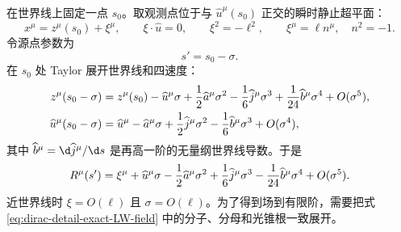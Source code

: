 在世界线上固定一点 $s_0$。取观测点位于与 $\widehat u^\mu(s_0)$ 正交的瞬时静止超平面：
\begin{equation}
 x^\mu=z^\mu(s_0)+\xi^\mu,
 \qquad
 \xi\cdot \widehat u=0,
 \qquad
 \xi^2=-\ell^2,
 \qquad
 \xi^\mu=\ell n^\mu,
 \quad n^2=-1.
 \label{eq:dirac-detail-near-point}
\end{equation}
令源点参数为
\begin{equation*}
 s'=s_0-\sigma.
\end{equation*}
在 $s_0$ 处 Taylor 展开世界线和四速度：
\begin{align}
 z^\mu(s_0-\sigma)
 &=z^\mu(s_0)-\widehat u^\mu\sigma
 +{1\over2}\widehat a^\mu\sigma^2
 -{1\over6}\widehat j^\mu\sigma^3
 +{1\over24}\widehat b^\mu\sigma^4+O(\sigma^5),
 \notag\\
 \widehat u^\mu(s_0-\sigma)
 &=\widehat u^\mu-\widehat a^\mu\sigma
 +{1\over2}\widehat j^\mu\sigma^2
 -{1\over6}\widehat b^\mu\sigma^3+O(\sigma^4),
 \label{eq:dirac-detail-worldline-Taylor-full}
\end{align}
其中 $\widehat b^\mu=\d \widehat j^\mu/\d s$ 是再高一阶的无量纲世界线导数。于是
\begin{equation}
 R^\mu(s')
 =\xi^\mu+\widehat u^\mu\sigma
 -{1\over2}\widehat a^\mu\sigma^2
 +{1\over6}\widehat j^\mu\sigma^3
 -{1\over24}\widehat b^\mu\sigma^4+O(\sigma^5).
 \label{eq:dirac-detail-R-Taylor}
\end{equation}
近世界线时 $\xi=O(\ell)$ 且 $\sigma=O(\ell)$。为了得到场到有限阶，需要把式 \eqref{eq:dirac-detail-exact-LW-field} 中的分子、分母和光锥根一致展开。

